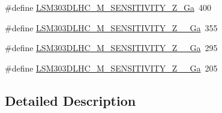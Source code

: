 \begin{DoxyCompactItemize}
\item 
\#define \hyperlink{group__Magnetometer__Sensitivity_gab0b56e470d5b68ecf4f0eb6fc9c7ec66}{L\+S\+M303\+D\+L\+H\+C\+\_\+\+M\+\_\+\+S\+E\+N\+S\+I\+T\+I\+V\+I\+T\+Y\+\_\+\+Z\+\_\+Ga}~400
\item 
\#define \hyperlink{group__Magnetometer__Sensitivity_ga2445ecaa95fca04f93a76bbdd3d98d18}{L\+S\+M303\+D\+L\+H\+C\+\_\+\+M\+\_\+\+S\+E\+N\+S\+I\+T\+I\+V\+I\+T\+Y\+\_\+\+Z\+\_\+\_\+Ga}~355
\item 
\#define \hyperlink{group__Magnetometer__Sensitivity_ga60849454e83e2bf9657583c92cbde733}{L\+S\+M303\+D\+L\+H\+C\+\_\+\+M\+\_\+\+S\+E\+N\+S\+I\+T\+I\+V\+I\+T\+Y\+\_\+\+Z\+\_\+\_\+Ga}~295
\item 
\#define \hyperlink{group__Magnetometer__Sensitivity_gaea207edfed985ab3f23d3ca3cdda85ae}{L\+S\+M303\+D\+L\+H\+C\+\_\+\+M\+\_\+\+S\+E\+N\+S\+I\+T\+I\+V\+I\+T\+Y\+\_\+\+Z\+\_\+\_\+Ga}~205
\end{DoxyCompactItemize}


\subsection{Detailed Description}



